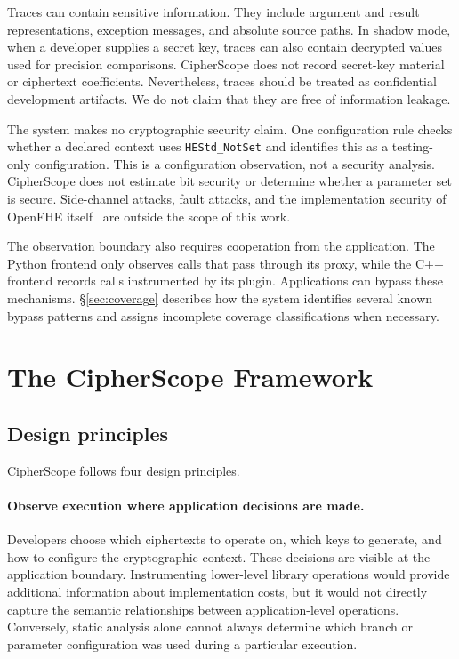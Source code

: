 \documentclass[sigconf,nonacm]{acmart}
\begin{document}
Traces can contain sensitive information. They include argument and result
representations, exception messages, and absolute source paths. In shadow
mode, when a developer supplies a secret key, traces can also contain
decrypted values used for precision comparisons. CipherScope does not record
secret-key material or ciphertext coefficients. Nevertheless, traces should
be treated as confidential development artifacts. We do not claim that they
are free of information leakage.

The system makes no cryptographic security claim. One configuration rule
checks whether a declared context uses \texttt{HEStd\_NotSet} and identifies
this as a testing-only configuration. This is a configuration observation,
not a security analysis. CipherScope does not estimate bit security or
determine whether a parameter set is secure. Side-channel attacks, fault
attacks, and the implementation security of OpenFHE
itself~\cite{safetycentric2025} are outside the scope of this work.

The observation boundary also requires cooperation from the application. The
Python frontend only observes calls that pass through its proxy, while the
C++ frontend records calls instrumented by its plugin. Applications can
bypass these mechanisms. \S\ref{sec:coverage} describes how the system
identifies several known bypass patterns and assigns incomplete coverage
classifications when necessary.

\section{The CipherScope Framework}
\label{sec:framework}

\subsection{Design principles}
\label{sec:principles}

CipherScope follows four design principles.

\paragraph{Observe execution where application decisions are made.}
Developers choose which ciphertexts to operate on, which keys to generate,
and how to configure the cryptographic context. These decisions are visible
at the application boundary. Instrumenting lower-level library operations
would provide additional information about implementation costs, but it would
not directly capture the semantic relationships between application-level
operations. Conversely, static analysis alone cannot always determine which
branch or parameter configuration was used during a particular execution.
\end{document}
